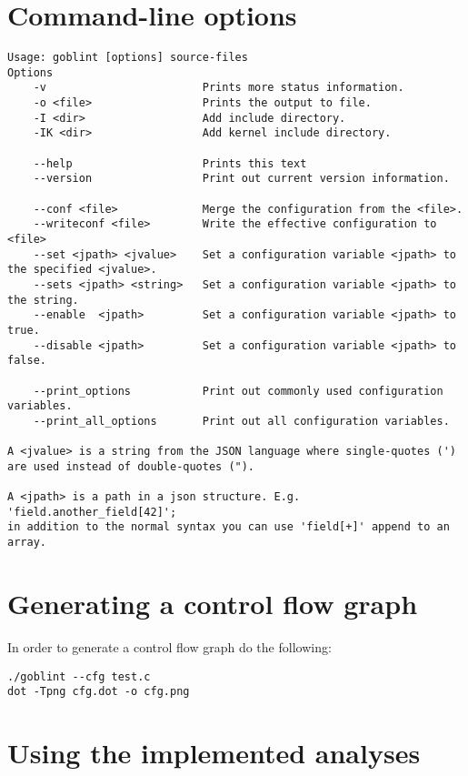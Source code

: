 \section{Command-line options}
\begin{lstlisting}
Usage: goblint [options] source-files
Options
    -v                        Prints more status information.                 
    -o <file>                 Prints the output to file.                      
    -I <dir>                  Add include directory.                          
    -IK <dir>                 Add kernel include directory.                   

    --help                    Prints this text                                
    --version                 Print out current version information.          

    --conf <file>             Merge the configuration from the <file>.        
    --writeconf <file>        Write the effective configuration to <file>     
    --set <jpath> <jvalue>    Set a configuration variable <jpath> to the specified <jvalue>.
    --sets <jpath> <string>   Set a configuration variable <jpath> to the string.
    --enable  <jpath>         Set a configuration variable <jpath> to true.   
    --disable <jpath>         Set a configuration variable <jpath> to false.  

    --print_options           Print out commonly used configuration variables.
    --print_all_options       Print out all configuration variables.          

A <jvalue> is a string from the JSON language where single-quotes (') are used instead of double-quotes (").

A <jpath> is a path in a json structure. E.g. 'field.another_field[42]';
in addition to the normal syntax you can use 'field[+]' append to an array.
\end{lstlisting}


\section{Generating a control flow graph}
In order to generate a control flow graph do the following:
\begin{lstlisting}
./goblint --cfg test.c
dot -Tpng cfg.dot -o cfg.png 
\end{lstlisting}


\section{Using the implemented analyses}
